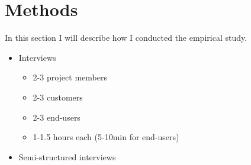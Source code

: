 
\chapter{Methods}
\label{chapter:methods}

In this section I will describe how I conducted the empirical study.

\begin{itemize}
  \item{Interviews}
  \begin{itemize}
    \item{2-3 project members}
    \item{2-3 customers}
    \item{2-3 end-users}
    \item{1-1.5 hours each (5-10min for end-users)}
  \end{itemize}
  \item{Semi-structured interviews}
\end{itemize}

